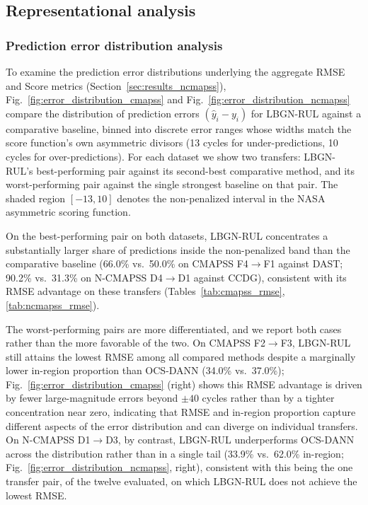 \subsection{Representational analysis}\label{subsec:representation}

\subsubsection{Prediction error distribution analysis}\label{subsubsec:error_distribution_analysis}

To examine the prediction error distributions underlying the aggregate RMSE and Score metrics (Section~\ref{sec:results_ncmapss}), Fig.~\ref{fig:error_distribution_cmapss} and Fig.~\ref{fig:error_distribution_ncmapss} compare the distribution of prediction errors $(\hat{y}_i - y_i)$ for LBGN-RUL against a comparative baseline, binned into discrete error ranges whose widths match the score function's own asymmetric divisors (13 cycles for under-predictions, 10 cycles for over-predictions). For each dataset we show two transfers: LBGN-RUL's best-performing pair against its second-best comparative method, and its worst-performing pair against the single strongest baseline on that pair. The shaded region $[-13, 10]$ denotes the non-penalized interval in the NASA asymmetric scoring function.

On the best-performing pair on both datasets, LBGN-RUL concentrates a substantially larger share of predictions inside the non-penalized band than the comparative baseline (66.0\% vs.\ 50.0\% on CMAPSS F4$\to$F1 against DAST; 90.2\% vs.\ 31.3\% on N-CMAPSS D4$\to$D1 against CCDG), consistent with its RMSE advantage on these transfers (Tables~\ref{tab:cmapss_rmse}, \ref{tab:ncmapss_rmse}).

The worst-performing pairs are more differentiated, and we report both cases rather than the more favorable of the two. On CMAPSS F2$\to$F3, LBGN-RUL still attains the lowest RMSE among all compared methods despite a marginally lower in-region proportion than OCS-DANN (34.0\% vs.\ 37.0\%); Fig.~\ref{fig:error_distribution_cmapss} (right) shows this RMSE advantage is driven by fewer large-magnitude errors beyond $\pm40$ cycles rather than by a tighter concentration near zero, indicating that RMSE and in-region proportion capture different aspects of the error distribution and can diverge on individual transfers. On N-CMAPSS D1$\to$D3, by contrast, LBGN-RUL underperforms OCS-DANN across the distribution rather than in a single tail (33.9\% vs.\ 62.0\% in-region; Fig.~\ref{fig:error_distribution_ncmapss}, right), consistent with this being the one transfer pair, of the twelve evaluated, on which LBGN-RUL does not achieve the lowest RMSE.

